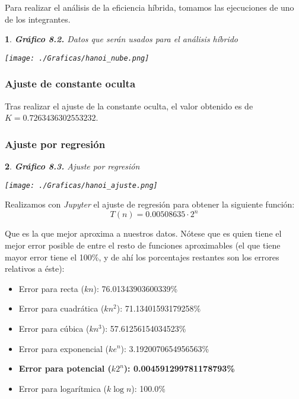 \documentclass[10pt, a4paper]{article}
\theoremstyle{theorem-style}
\newtheorem*{datos}{}
\theoremstyle{theorem-style}
\theoremstyle{definition-style}
\theoremstyle{remark-style}
\theoremstyle{example-style}
\theoremstyle{definition-style}
\theoremstyle{remark-style}
\begin{document}
Para realizar el análisis de la eficiencia híbrida, tomamos las ejecuciones de uno de los integrantes.
\pagebreak
\begin{datos}
	{\bf\sffamily Gráfico 8.2.} {\sffamily Datos que serán usados para el análisis híbrido}\\
	\vspace{-0.7cm}
	\begin{center}
		\texttt{[image: ./Graficas/hanoi\_nube.png]}
	\end{center}	
\end{datos}

\subsubsection{Ajuste de constante oculta}

Tras realizar el ajuste de la constante oculta, el valor obtenido es de $K=0.7263436302553232$.

\subsubsection{Ajuste por regresión}

\begin{datos}
	{\bf\sffamily Gráfico 8.3.} {\sffamily Ajuste por regresión}\\
	\vspace{-0.7cm}
	\begin{center}
		\texttt{[image: ./Graficas/hanoi\_ajuste.png]}
	\end{center}	
\end{datos}

Realizamos con \emph{Jupyter} el ajuste de regresión para obtener la siguiente función:
$$T(n)=0.00508635\cdot 2^n$$

Que es la que mejor aproxima a nuestros datos. Nótese que es quien tiene el mejor error posible de entre el resto de funciones aproximables (el que tiene mayor error tiene el 100\%, y de ahí los porcentajes restantes son los errores relativos a éste):

\begin{itemize}
	\item Error para recta ($kn$): 76.01343903600339\%
	\item Error para cuadrática ($kn^2$): 71.13401593179258\%
	\item Error para cúbica ($kn^3$): 57.61256154034523\%
	\item Error para exponencial ($ke^n$): 3.1920070654956563\%
	\item \textbf{Error para potencial ($k2^n$): 0.004591299781178793\%}
	\item Error para logarítmica ($k\log n$): 100.0\%
\end{itemize}
\end{document}
